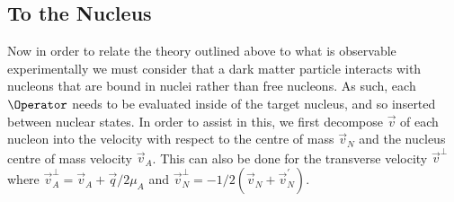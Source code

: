 \subsection{To the Nucleus}
\par
Now in order to relate the theory outlined above to what is observable experimentally we must consider that a dark matter particle interacts with nucleons that are bound in nuclei rather than free nucleons.
As such, each $\Operator$ needs to be evaluated inside of the target nucleus, and so inserted between nuclear states.
In order to assist in this, we first decompose $\vec{v}$ of each nucleon into the velocity with respect to the centre of mass $\vec{v}_{N}$ and the nucleus centre of mass velocity $\vec{v}_{A}$.
This can also be done for the transverse velocity $\vec{v}^{\perp}$ where $\vec{v}^{\perp}_{A}=\vec{v}_A + \vec{q}/2\mu_{A}$ and $\vec{v}^{\perp}_{N}=-1/2(\vec{v}_{N} + \vec{v}^{'}_{N})$.

